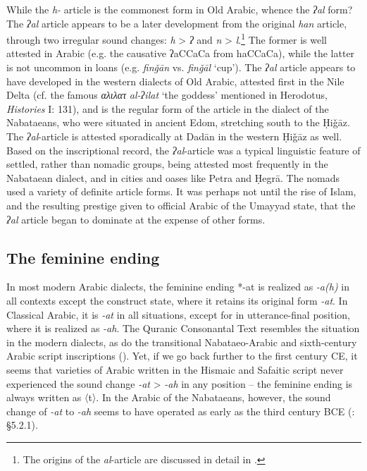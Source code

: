 \documentclass[output=paper]{langsci/langscibook}
\begin{document}
While the \textit{h-} article is the commonest form in Old Arabic, whence the \textit{ʔal} form? The \textit{ʔal} article appears to be a later development from the original \textit{han} article, through two irregular sound changes: \textit{h} > \textit{ʔ} and \textit{n} > \textit{l}.\footnote{The origins of the \textit{al}-article are discussed in detail in \citep{Al-Jalladforthcoming}.} The former is well attested in Arabic (e.g. the causative ʔaCCaCa from haCCaCa), while the latter is not uncommon in loans (e.g. \textit{finǧān} vs. \textit{finǧāl} ‘cup’). The \textit{ʔal} article appears to have developed in the western dialects of Old Arabic, attested first in the Nile Delta (cf. the famous \textit{αλιλατ} \textit{al-ʔilat} ‘the goddess’ mentioned in Herodotus, \textit{Histories} I: 131), and is the regular form of the article in the dialect of the Nabataeans, who were situated in ancient Edom, stretching south to the Ḥiǧāz. The \textit{ʔal}-article is attested sporadically at Dadān in the western Ḥiǧāz as well. Based on the inscriptional record, the \textit{ʔal}-article was a typical linguistic feature of settled, rather than nomadic groups, being attested most frequently in the Nabataean dialect, and in cities and oases like Petra and Ḥegrā. The nomads used a variety of definite article forms. It was perhaps not until the rise of Islam, and the resulting prestige given to official Arabic of the Umayyad state, that the \textit{ʔal} article began to dominate at the expense of other forms.

\subsection{The feminine ending}
In most modern Arabic dialects, the feminine ending *-at is realized as \textit{-a(h)} in all contexts except the construct state, where it retains its original form \textit{-at}. In Classical Arabic, it is \textit{-at} in all situations, except for in utterance-final position, where it is realized as \textit{-ah}. The Quranic Consonantal Text resembles the situation in the modern dialects, as do the transitional Nabataeo-Arabic and sixth-century Arabic script inscriptions (\citealt{Nehmé2017}). Yet, if we go back further to the first century CE, it seems that varieties of Arabic written in the Hismaic and Safaitic script never experienced the sound change \textit{-at} > \textit{-ah} in any position – the feminine ending is always written as 〈t〉. In the Arabic of the Nabataeans, however, the sound change of \textit{-at} to \textit{-ah} seems to have operated as early as the third century BCE (\citealt{Al-Jallad2017early}: §5.2.1). 
\end{document}
